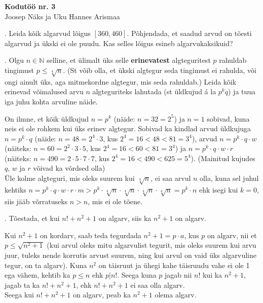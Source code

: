 \documentclass[a4paper, 10pt]{article}
\newcommand{\N}{\mathbb{N}}
\begin{document}
\begin{center}
\Large\textbf{Kodutöö nr. 3}\\
\small{Joosep Näks ja Uku Hannes Arismaa}
\end{center}

\bigskip

. Leida k\~oik algarvud lõigus $[360, 460]$. Põhjendada, et saadud arvud on tõesti algarvud ja ükski ei ole puudu. Kas selles lõigus esineb alg\-arvukaksikuid?

\bigskip

. Olgu $n\in\N$ selline, et ülimalt üks selle {\bf erinevatest} algteguritest $p$ rahuldab tingimust $p\leq \sqrt[4]{n}$. (St võib olla, et ükski algtegur seda tingimust ei rahulda, või ongi ainult üks, aga mitmekordne algtegur, mis seda rahuldab.) Leida kõik erinevad võimalused arvu $n$ algteguriteks lahutada (st üldkujud \'a la $p^kq$) ja tuua iga juhu kohta arvuline näide. 

\bigskip

On ilmne, et kõik üldkujud $n=p^k$ (näide: $n=32=2^5$) ja $n=1$ sobivad, kuna neis ei ole rohkem kui üks erinev algtegur. Sobivad ka kindlad arvud üldkujuga $n=p^k\cdot q$ (näide: $n=48=2^4\cdot3$, kus $2^4=16<48<81=3^4$), arvud $n=p^k\cdot q\cdot w$ (näiteks: $n=60=2^2\cdot3\cdot5$, kus $2^4=16<60<81=3^4$) ja $n=p^k\cdot q\cdot w\cdot r$ (näiteks: $n=490=2\cdot5\cdot7\cdot7$, kus $2^4=16<490<625=5^4$). (Mainitud kujudes $q$, $w$ ja $r$ võivad ka võrdsed olla)\\
Üle kolme algteguri, mis oleks suurem kui $\sqrt[4]n$, ei saa arvul $n$ olla, kuna sel juhul kehtiks $n=p^k\cdot q\cdot w\cdot r\cdot m>p^k\cdot\sqrt[4]n\cdot\sqrt[4]n\cdot\sqrt[4]n\cdot\sqrt[4]n=p^k\cdot n$ ehk isegi kui $k=0$, siis jääb võrratuseks $n>n$, mis ei ole tõene.

\bigskip

. Tõestada, et kui $n!+n^2+1$ on algarv, siis ka $n^2+1$ on algarv. 

\bigskip

Kui $n^2+1$ on kordarv, saab teda tegurdada $n^2+1=p\cdot a$, kus $p$ on algarv, nii et $p\leq\sqrt{n^2+1}$ (kui arvul oleks mitu algarvulist tegurit, mis oleks suurem kui arvu juur, tuleks nende korrutis arvust suurem, ning kui arvul on vaid üks algarvuline tegur, on ta algarv). Kuna $n^2$ on täisruut ja ühegi kahe täisruudu vahe ei ole 1 ega vähem, kehtib ka $p\leq n$ ehk $p|n!$. Seega kuna $p$ jagab nii $n!$ kui ka $n^2+1$, jagab ta ka $n!+n^2+1$, ehk $n!+n^2+1$ ei saa olla algarv.\\
Seega kui $n!+n^2+1$ on algarv, peab ka $n^2+1$ olema algarv.
\end{document}
